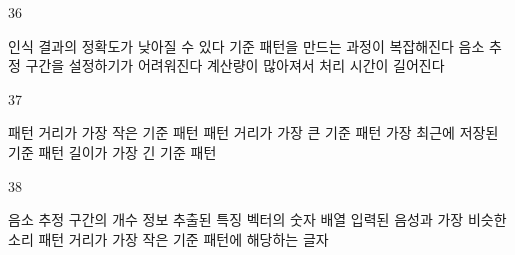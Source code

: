 \documentclass[fs9,seriesRus]{korfarm-base}
\begin{document}
\begin{kfSentenceUnit}{36}{}
\begin{kfChoices}
\kfChoice 인식 결과의 정확도가 낮아질 수 있다
\kfChoice 기준 패턴을 만드는 과정이 복잡해진다
\kfChoice 음소 추정 구간을 설정하기가 어려워진다
\kfChoice 계산량이 많아져서 처리 시간이 길어진다
\end{kfChoices}
\end{kfSentenceUnit}

\begin{kfSentenceUnit}{37}{}
\begin{kfChoices}
\kfChoice 패턴 거리가 가장 작은 기준 패턴
\kfChoice 패턴 거리가 가장 큰 기준 패턴
\kfChoice 가장 최근에 저장된 기준 패턴
\kfChoice 길이가 가장 긴 기준 패턴
\end{kfChoices}
\end{kfSentenceUnit}

\begin{kfSentenceUnit}{38}{}
\begin{kfChoices}
\kfChoice 음소 추정 구간의 개수 정보
\kfChoice 추출된 특징 벡터의 숫자 배열
\kfChoice 입력된 음성과 가장 비슷한 소리
\kfChoice 패턴 거리가 가장 작은 기준 패턴에 해당하는 글자
\end{kfChoices}
\end{kfSentenceUnit}

\kfEndMC

\kfActivityBg \par{}\par\nopagebreak[4]\smallskip\nopagebreak[4]
\begin{kfStructure}
\end{kfStructure}

\end{document}
